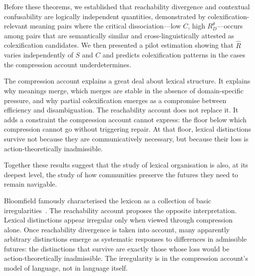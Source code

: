 \documentclass[12pt]{article}
\theoremstyle{rthm}
\theoremstyle{rdef}
\theoremstyle{remark}
\newcommand{\RD}[1][\theta]{R_{D}^{#1}}
\begin{document}
Before these theorems, we established that reachability divergence and contextual
confusability are logically independent quantities, demonstrated by
colexification-relevant meaning pairs where the critical dissociation---low $C$,
high $\RD$---occurs among pairs that are semantically similar and cross-linguistically
attested as colexification candidates. We then presented a pilot estimation showing
that $\widehat{R}$ varies independently of $S$ and $C$ and predicts colexification
patterns in the cases the compression account underdetermines.

The compression account explains a great deal about lexical structure. It explains
why meanings merge, which merges are stable in the absence of domain-specific
pressure, and why partial colexification emerges as a compromise between
efficiency and disambiguation. The reachability account does not replace it. It
adds a constraint the compression account cannot express: the floor below which
compression cannot go without triggering repair. At that floor, lexical
distinctions survive not because they are communicatively necessary, but because
their loss is action-theoretically inadmissible.

Together these results suggest that the study of lexical organisation is also,
at its deepest level, the study of how communities preserve the futures they need
to remain navigable.

Bloomfield famously characterised the lexicon as a collection of basic
irregularities~\cite{bloomfield1933}. The reachability account proposes the
opposite interpretation. Lexical distinctions appear irregular only when viewed
through compression alone. Once reachability divergence is taken into account,
many apparently arbitrary distinctions emerge as systematic responses to
differences in admissible futures: the distinctions that survive are exactly
those whose loss would be action-theoretically inadmissible. The irregularity
is in the compression account's model of language, not in language itself.
\end{document}
